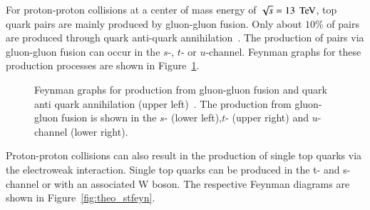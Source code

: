 For proton-proton collisions at a center of mass energy of $\sqrt{s}=13\;\,\text{Te\hspace{-.08em}V}$, top quark pairs are mainly produced by gluon-gluon fusion. Only about $10\%$ of \ttbar pairs
are produced through quark anti-quark annihilation~\cite{Olive:2016xmw}. The production of \ttbar pairs via gluon-gluon fusion can occur in the $s$-, $t$- or $u$-channel. Feynman graphs for these production processes
are shown in Figure~\ref{fig:theo_ttfeyn}.

\begin{figure}[htbp!]
  \begin{center}
\caption{Feynman graphs for \ttbar production from gluon-gluon fusion and quark anti quark annihilation (upper left)~\cite{Husemann:2017eka}. The production from gluon-gluon fusion is shown in the $s$- (lower left),$t$- (upper right) and $u$-channel (lower right).
  \label{fig:theo_ttfeyn}}
  \end{center}
\end{figure}

Proton-proton collisions can also result in the production of single top quarks via the electroweak interaction. 
Single top quarks can be produced in the t- and s-channel or with an associated W boson. The respective Feynman diagrams are shown in Figure~\ref{fig:theo_stfeyn}.


